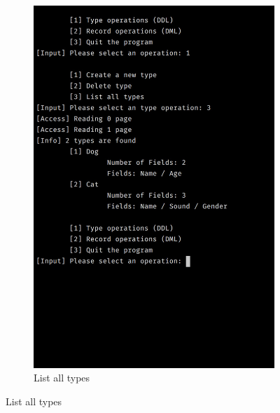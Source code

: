 \documentclass[12pt,a4paper]{article}
\begin{document}
\begin{figure}
\begin{subfigure}{.5\textwidth}
  \includegraphics[width=.90\linewidth]{ss2.jpg}
  \caption{List all types}
  \label{fig:sub2}
\end{subfigure}
\end{figure}
\end{document}
